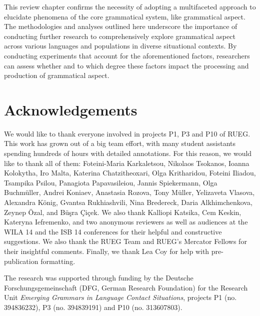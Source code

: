 \documentclass[output=paper,colorlinks,citecolor=brown]{langscibook}
\begin{document}
\begin{sloppypar}
This review chapter confirms the necessity of adopting a multifaceted approach to elucidate phenomena of the core grammatical system, like grammatical aspect. The methodologies and analyses outlined here underscore the importance of conducting further research to comprehensively explore grammatical aspect across various languages and populations in diverse situational contexts. By conducting experiments that account for the aforementioned factors, researchers can assess whether and to which degree these factors impact the processing and production of grammatical aspect. 
\end{sloppypar}

\section*{Acknowledgements}
We would like to thank everyone involved in projects P1, P3 and P10 of RUEG.
This work has grown out of a big team effort, with many student assistants spending hundreds of hours with detailed annotations. For this reason, we would like to thank all of them: Foteini-Maria Karkaletsou, Nikolaos Tsokanos, Ioanna Kolokytha, Iro Malta, Katerina Chatzitheoxari, Olga Kritharidou, Foteini Iliadou, Tsampika Psilou, Panagiota Papavasileiou, Jannis Spiekermann, Olga Buchmüller, Andrei Koniaev, Anastasia Rozova, Tony Müller, Yelizaveta Vlasova, Alexandra König, Gvantsa Rukhiashvili, Nina Bredereck, Daria Alkhimchenkova, Zeynep Özal, and Büşra Çiçek.
We also thank Kalliopi Katsika, Cem Keskin, Kateryna Iefremenko, and  two anonymous reviewers as well as audiences at the WILA 14 and the ISB 14 conferences for their helpful and constructive suggestions. We also thank the RUEG Team and RUEG's Mercator Fellows for their insightful comments. Finally, we thank Lea Coy for help with pre-publication formatting.

The research was supported through funding by the Deutsche Forschungsgemeinschaft (DFG, German Research Foundation) for the Research Unit \textit{Emerging Grammars in Language Contact Situations}, projects P1 (no. 394836232), P3 (no. 394839191) and P10 (no. 313607803).

\printbibliography[heading=subbibliography,notkeyword=this]
\end{document}
